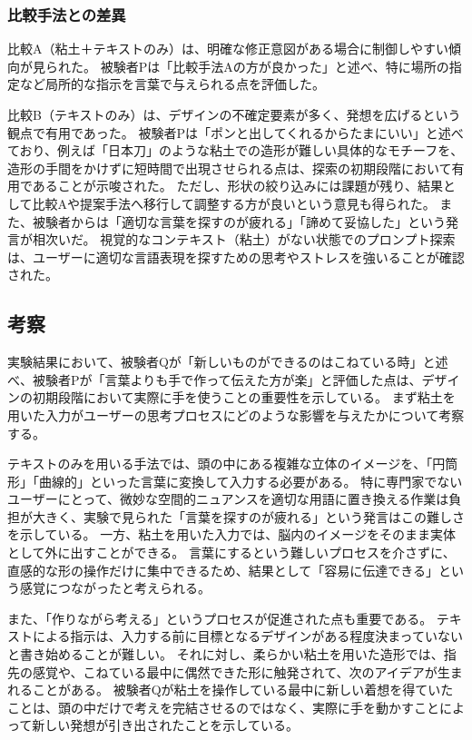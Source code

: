 \documentclass{kuisthesis}
\begin{document}
\subsubsection{比較手法との差異}
比較A（粘土＋テキストのみ）は、明確な修正意図がある場合に制御しやすい傾向が見られた。
被験者Pは「比較手法Aの方が良かった」と述べ、特に場所の指定など局所的な指示を言葉で与えられる点を評価した。

比較B（テキストのみ）は、デザインの不確定要素が多く、発想を広げるという観点で有用であった。
被験者Pは「ポンと出してくれるからたまにいい」と述べており、例えば「日本刀」のような粘土での造形が難しい具体的なモチーフを、造形の手間をかけずに短時間で出現させられる点は、探索の初期段階において有用であることが示唆された。
ただし、形状の絞り込みには課題が残り、結果として比較Aや提案手法へ移行して調整する方が良いという意見も得られた。
また、被験者からは「適切な言葉を探すのが疲れる」「諦めて妥協した」という発言が相次いだ。
視覚的なコンテキスト（粘土）がない状態でのプロンプト探索は、ユーザーに適切な言語表現を探すための思考やストレスを強いることが確認された。

\subsection{考察}
実験結果において、被験者Qが「新しいものができるのはこねている時」と述べ、被験者Pが「言葉よりも手で作って伝えた方が楽」と評価した点は、デザインの初期段階において実際に手を使うことの重要性を示している。
まず粘土を用いた入力がユーザーの思考プロセスにどのような影響を与えたかについて考察する。

テキストのみを用いる手法では、頭の中にある複雑な立体のイメージを、「円筒形」「曲線的」といった言葉に変換して入力する必要がある。 
特に専門家でないユーザーにとって、微妙な空間的ニュアンスを適切な用語に置き換える作業は負担が大きく、実験で見られた「言葉を探すのが疲れる」という発言はこの難しさを示している。
一方、粘土を用いた入力では、脳内のイメージをそのまま実体として外に出すことができる。 言葉にするという難しいプロセスを介さずに、直感的な形の操作だけに集中できるため、結果として「容易に伝達できる」という感覚につながったと考えられる。

また、「作りながら考える」というプロセスが促進された点も重要である。
テキストによる指示は、入力する前に目標となるデザインがある程度決まっていないと書き始めることが難しい。 
それに対し、柔らかい粘土を用いた造形では、指先の感覚や、こねている最中に偶然できた形に触発されて、次のアイデアが生まれることがある。 
被験者Qが粘土を操作している最中に新しい着想を得ていたことは、頭の中だけで考えを完結させるのではなく、実際に手を動かすことによって新しい発想が引き出されたことを示している。
\end{document}
